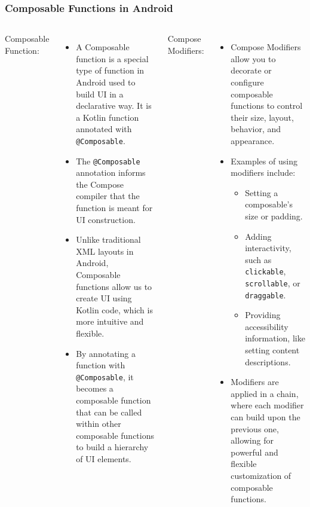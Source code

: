 \documentclass[pdf,
serif,
compress,
xcolor=table,
dvipsnames,
spanish,
aspectratio=169]{beamer}
\begin{document}
\begin{frame}
\frametitle{Composable Functions in Android}
\begin{columns}
Composable Function:
\begin{itemize}\tiny
\item A Composable function is a special type of function in Android used to build UI in a declarative way. It is a Kotlin function annotated with \texttt{@Composable}.
\item The \texttt{@Composable} annotation informs the Compose compiler that the function is meant for UI construction.
\item Unlike traditional XML layouts in Android, Composable functions allow us to create UI using Kotlin code, which is more intuitive and flexible.
\item By annotating a function with \texttt{@Composable}, it becomes a composable function that can be called within other composable functions to build a hierarchy of UI elements.
\end{itemize}
Compose Modifiers:
\begin{itemize}\tiny
\item Compose Modifiers allow you to decorate or configure composable functions to control their size, layout, behavior, and appearance.
\item Examples of using modifiers include:
    \begin{itemize}\tiny
        \item Setting a composable's size or padding.
        \item Adding interactivity, such as \texttt{clickable}, \texttt{scrollable}, or \texttt{draggable}.
        \item Providing accessibility information, like setting content descriptions.
    \end{itemize}
\item Modifiers are applied in a chain, where each modifier can build upon the previous one, allowing for powerful and flexible customization of composable functions.
\end{itemize}   
\end{columns}
\end{frame}
\end{document}

